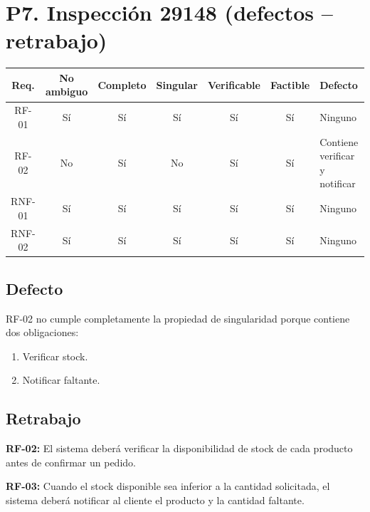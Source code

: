 \documentclass[12pt]{article}
\begin{document}
\section*{P7. Inspección 29148 (defectos -- retrabajo)}

\begin{center}
\small
\renewcommand{\arraystretch}{1.3}

\begin{tabular}{|c|c|c|c|c|c|p{3cm}|}
\hline
\textbf{Req.} &
\textbf{No ambiguo} &
\textbf{Completo} &
\textbf{Singular} &
\textbf{Verificable} &
\textbf{Factible} &
\textbf{Defecto} \\ \hline

RF-01 & Sí & Sí & Sí & Sí & Sí & Ninguno \\ \hline
RF-02 & No & Sí & No & Sí & Sí & Contiene verificar y notificar \\ \hline
RNF-01 & Sí & Sí & Sí & Sí & Sí & Ninguno \\ \hline
RNF-02 & Sí & Sí & Sí & Sí & Sí & Ninguno \\ \hline

\end{tabular}
\end{center}

\subsection*{Defecto}

RF-02 no cumple completamente la propiedad de singularidad porque
contiene dos obligaciones:

\begin{enumerate}
    \item Verificar stock.
    \item Notificar faltante.
\end{enumerate}

\subsection*{Retrabajo}

\textbf{RF-02:} El sistema deberá verificar la disponibilidad de stock
de cada producto antes de confirmar un pedido.

\medskip

\textbf{RF-03:} Cuando el stock disponible sea inferior a la cantidad
solicitada, el sistema deberá notificar al cliente el producto y la
cantidad faltante.

\end{document}
